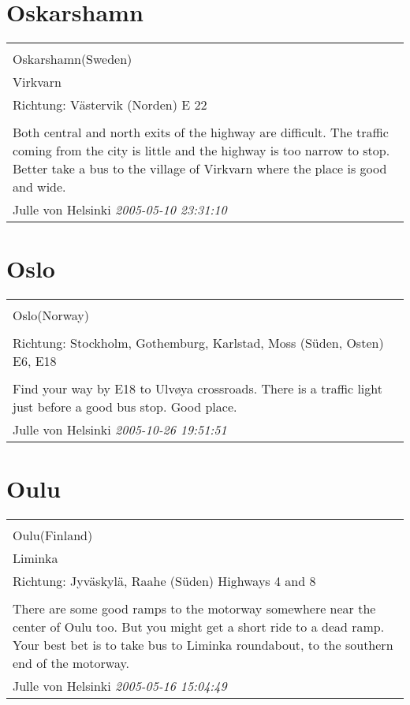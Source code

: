 \documentclass[a4paper,12pt]{article}
\begin{document}
\section{Oskarshamn}
\begin{tabular}{|p{13cm}|}
\hline\\
Oskarshamn(Sweden)\\
Virkvarn\\
Richtung: Västervik (Norden) E 22 \\
\hline\\
Both central and north exits of the highway are difficult. The traffic coming from the city is little and the highway is too narrow to stop. Better take a bus to the village of Virkvarn where the place is good and wide. \\
Julle von Helsinki \textit{ 2005-05-10 23:31:10 }\\\hline
\end{tabular}


\section{Oslo}
\begin{tabular}{|p{13cm}|}
\hline\\
Oslo(Norway)\\
\\
Richtung: Stockholm, Gothemburg, Karlstad, Moss (Süden, Osten) E6, E18 \\
\hline\\
Find your way by E18 to Ulvøya crossroads. There is a traffic light just before a good bus stop. Good place. \\
Julle von Helsinki \textit{ 2005-10-26 19:51:51 }\\\hline
\end{tabular}


\section{Oulu}
\begin{tabular}{|p{13cm}|}
\hline\\
Oulu(Finland)\\
Liminka\\
Richtung: Jyväskylä, Raahe (Süden) Highways 4 and 8 \\
\hline\\
There are some good ramps to the motorway somewhere near the center of Oulu too. But you might get a short ride to a dead ramp. Your best bet is to take bus to Liminka roundabout, to the southern end of the motorway. \\
Julle von Helsinki \textit{ 2005-05-16 15:04:49 }\\\hline
\end{tabular}
\end{document}
